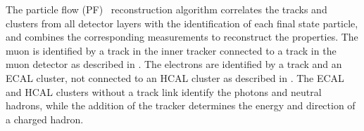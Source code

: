 The particle flow (PF)~\cite{CMS-PRF-14-001} reconstruction algorithm correlates the tracks and clusters from all detector layers with the identification of each final state particle, and combines the corresponding measurements to reconstruct the properties. The muon is identified by a track in the inner tracker connected to a track in the muon detector as described in . The electrons are identified by a track and an ECAL cluster, not connected to an HCAL cluster as described in . The ECAL and HCAL clusters without a track link identify the photons and neutral hadrons, while the addition of the tracker determines the energy and direction of a charged hadron. 



